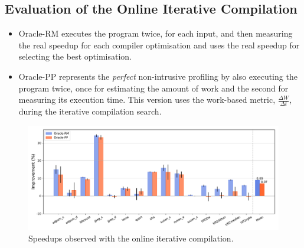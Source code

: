 \documentclass[sigplan,9pt]{acmart}
\newcommand{\itercomp}{{iterative compilation}}
\newcommand{\IterComp}{{Iterative Compilation}}
\begin{document}
\subsection{Evaluation of the Online {\IterComp}}

\begin{itemize}
\item Oracle-RM executes the program twice, for each input, and then measuring
the real speedup for each compiler optimisation and uses the real speedup for
selecting the best optimisation.
\item Oracle-PP represents the \textit{perfect} non-intrusive profiling by also
executing the program twice, once for estimating the amount of work and the
second for measuring its execution time.
This version uses the work-based metric, $\frac{\Delta W}{\Delta t}$, during
the {\itercomp} search.
\end{itemize}



\begin{figure}[htb]
    \centering
    \includegraphics[width=\textwidth]{figs/speedups.pdf}
    \caption{Speedups observed with the online {\itercomp}.}
    \label{fig:speedups}
\end{figure}


%
%
\end{document}
